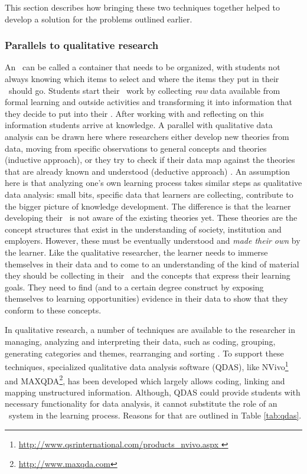 This section describes how bringing these two techniques together helped to
develop a solution for the problems outlined earlier.

\subsubsection{Parallels to qualitative research}

An \ep~can be called a container that needs to be organized, with students not
always knowing which items to select and where the items they put in their
\ep~should go. Students start their \ep~work by collecting \textit{raw} data
available from formal learning and outside activities and transforming it into
information that they decide to put into their \ep. After working with and
reflecting on this information students arrive at knowledge. A parallel with
qualitative data analysis can be drawn here where researchers either develop new
theories from data, moving from specific observations to general concepts and
theories (inductive approach), or they try to check if their data map against
the theories that are already known and understood (deductive approach)
\citep{Strauss2008,Patton2002}. An assumption here is that analyzing one's own
learning process takes similar steps as qualitative data analysis: small bits,
specific data that learners are collecting, contribute to the bigger picture of
knowledge development. The difference is that the learner developing their
\ep~is not aware of the existing theories yet. These theories are the concept
structures that exist in the understanding of society, institution and
employers. However, these must be eventually understood and \textit{made their
own} by the learner. Like the qualitative researcher, the learner needs to
immerse themselves in their data and to come to an understanding of the kind of
material they should be collecting in their \ep~and the concepts that express
their learning goals. They need to find (and to a certain degree construct by
exposing themselves to learning opportunities) evidence in their data to show
that they conform to these concepts.

In qualitative research, a number of techniques are available to the researcher
in managing, analyzing and interpreting their data, such as coding, grouping,
generating categories and themes, rearranging and sorting \citep{Marshall2010}.
To support these techniques, specialized qualitative data analysis software
(QDAS), like
NVivo\footnote{\url{http://www.qsrinternational.com/products_nvivo.aspx }} and
MAXQDA\footnote{\url{http://www.maxqda.com}}, has been developed which largely
allows coding, linking and mapping unstructured information. Although, QDAS
could provide students with necessary functionality for data analysis, it cannot
substitute the role of an \ep~system in the learning process. Reasons for
that are outlined in Table \ref{tab:qdas}.

